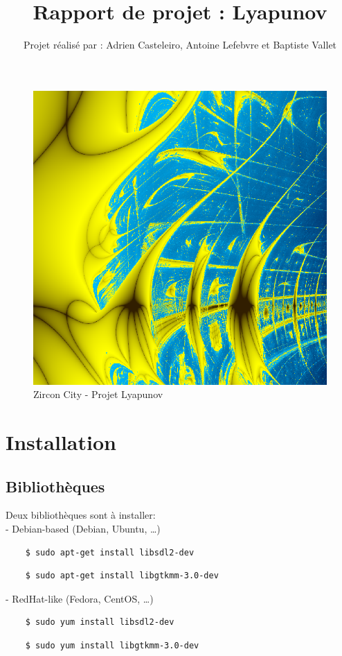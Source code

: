 \documentclass{article}
\title{Rapport de projet : Lyapunov}
\date{}
\author{Projet réalisé par : Adrien Casteleiro, Antoine Lefebvre et Baptiste Vallet}
\begin{document}
	\vspace*{-2pt}
	{\let\newpage\relax\maketitle} \thispagestyle{fancy}
	\begin{figure}[!h]
		\centering
		\includegraphics[scale=0.3]{zircon}
		\caption{Zircon City - Projet Lyapunov}
	\end{figure}
\newpage
	\tableofcontents
	\newpage
	\section{Installation}
	\subsection{Bibliothèques}
	\noindent Deux bibliothèques sont à installer:\\
	- Debian-based (Debian, Ubuntu, \ldots)
	\begin{lstlisting}
	$ sudo apt-get install libsdl2-dev
	\end{lstlisting}
	\begin{lstlisting}
	$ sudo apt-get install libgtkmm-3.0-dev
	\end{lstlisting}
	- RedHat-like (Fedora, CentOS, \ldots)
	\begin{lstlisting}
	$ sudo yum install libsdl2-dev
	\end{lstlisting}
	\begin{lstlisting}
	$ sudo yum install libgtkmm-3.0-dev
	\end{lstlisting}
\end{document}
